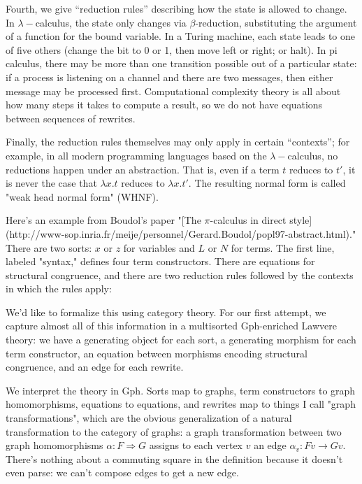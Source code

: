 \documentclass[a4paper,UKenglish]{article}
\begin{document}
Fourth, we give ``reduction rules'' describing how the state is allowed to change.  In $\lambda-$calculus, the state only changes via $\beta$-reduction, substituting the argument of a function for the
bound variable.  In a Turing machine, each state leads to one of five others (change the bit to 0 or 1, then move left or right; or halt). In pi calculus, there may be more than one transition possible out of a particular state: if a process is listening on a channel and there are two messages, then either message may be processed first. Computational complexity theory is all about how many steps it takes to compute a result, so we do not have equations between sequences of rewrites.

Finally, the reduction rules themselves may only apply in certain ``contexts''; for example, in all modern programming languages based
on the $\lambda-$calculus, no reductions happen under an abstraction. That is, even if a term $t$ reduces to $t'$, it is never the case that $\lambda x.t$ reduces to $\lambda x.t'$.  The resulting normal form is
called "weak head normal form" (WHNF).

Here's an example from Boudol's paper "[The $\pi$-calculus in direct style](http://www-sop.inria.fr/meije/personnel/Gerard.Boudol/popl97-abstract.html)."  There are two sorts: $x$ or $z$ for variables and $L$ or $N$ for
terms.  The first line, labeled "syntax," defines four term constructors.  There are equations for structural congruence, and there are two reduction rules followed by the contexts in which the rules apply: 



We'd like to formalize this using category theory.  For our first attempt, we capture almost all of this information in a multisorted Gph-enriched Lawvere theory: we have a generating object for each sort, a generating morphism for each term constructor, an equation between morphisms encoding structural congruence, and an edge for each rewrite.

We interpret the theory in Gph.  Sorts map to graphs, term constructors to graph homomorphisms, equations to equations, and rewrites map to things I call "graph transformations", which are the obvious generalization of a natural transformation to the category of graphs: a graph transformation between two graph homomorphisms $\alpha:F\Rightarrow G$ assigns to each vertex $v$ an edge
$\alpha_v:Fv \to Gv$.  There's nothing about a commuting square in the
definition because it doesn't even parse: we can't compose edges to get a new edge.
\end{document}

